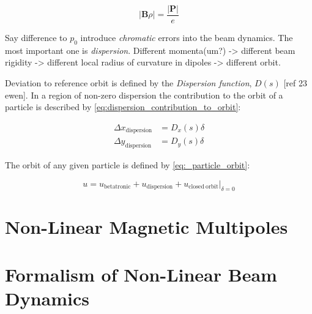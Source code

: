 \begin{equation}
    \lvert \mathbf{B} \rho \rvert = \frac{\lvert \mathbf{P} \lvert}{e}
    \label{eq:beam_rigidity}
\end{equation}
\bigbreak

Say difference to $p_0$ introduce \emph{chromatic} errors into the beam dynamics.
The most important one is \emph{dispersion}.
Different momenta(um?) -> different beam rigidity -> different local radius of curvature in dipoles -> different orbit.

Deviation to reference orbit is defined by the \emph{Dispersion function}, $D(s)$ [ref 23 ewen].
In a region of non-zero dispersion the contribution to the orbit of a particle is described by \cref{eq:dispersion_contribution_to_orbit}:
\bigbreak

\begin{equation}
    \begin{aligned}
    \Delta x_{\mathrm{dispersion}} &= D_{x}(s) \delta \\
    \Delta y_{\mathrm{dispersion}} &= D_{y}(s) \delta
    \end{aligned}
    \label{eq:dispersion_contribution_to_orbit}
\end{equation}
\bigbreak

The orbit of any given particle is defined by \cref{eq:_particle_orbit}:
\bigbreak

\begin{equation}
    u = u_{\mathrm{betatronic}} + u_{\mathrm{dispersion}} + \left.u_{\mathrm{closed \ orbit}} \right\rvert_{\delta = 0}
    \label{eq:_particle_orbit}
\end{equation}


\section{Non-Linear Magnetic Multipoles}


\section{Formalism of Non-Linear Beam Dynamics}


